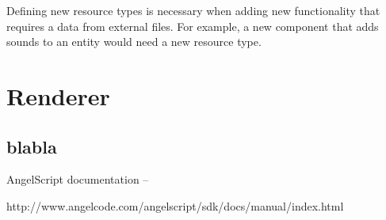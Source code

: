 \documentclass[a4paper, 12pt]{report}
\begin{document}
Defining new resource types is necessary when adding new functionality that requires a data from external files. For example, a new component that adds sounds to an entity would need a new resource type.

\chapter{Renderer}

\section{blabla}


\begin{thebibliography}{9}
AngelScript documentation -- 

http://www.angelcode.com/angelscript/sdk/docs/manual/index.html

\end{thebibliography}

\clearpage
{}
\listoffigures

\clearpage
{}
\listoftables
\end{document}
